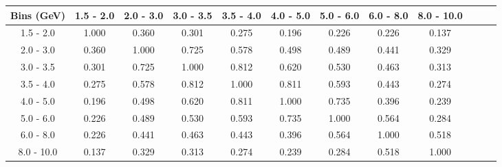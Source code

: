 \documentclass[aps, prd, reprint,showpacs,  preprintnumbers,amsmath,amssymb,superscriptaddress, nofootinbib]{revtex4-1}
\makeatletter
\newcommand{\anu}{\ensuremath{\bar{\nu}}}
\renewenvironment{table}
  {\def\@captype{table}}
  {}
\makeatother
\begin{document}
\begin{table}
\centering
\begin{tabular}{cccccccccccc}
\hline
    Bins (GeV) &  1.5 - 2.0 & 2.0 - 3.0 &  3.0 - 3.5 &    3.5 - 4.0 &    4.0 - 5.0 &    5.0 - 6.0 &    6.0 - 8.0 &   8.0 - 10.0  \\ 
\hline
  1.5 -   2.0  & 1.000  & 0.360  & 0.301  & 0.275  & 0.196  & 0.226  & 0.226  & 0.137 \\
  2.0 -   3.0  & 0.360  & 1.000  & 0.725  & 0.578  & 0.498  & 0.489  & 0.441  & 0.329 \\
  3.0 -   3.5  & 0.301  & 0.725  & 1.000  & 0.812  & 0.620  & 0.530  & 0.463  & 0.313 \\
  3.5 -   4.0  & 0.275  & 0.578  & 0.812  & 1.000  & 0.811  & 0.593  & 0.443  & 0.274 \\
  4.0 -   5.0  & 0.196  & 0.498  & 0.620  & 0.811  & 1.000  & 0.735  & 0.396  & 0.239 \\
  5.0 -   6.0  & 0.226  & 0.489  & 0.530  & 0.593  & 0.735  & 1.000  & 0.564  & 0.284 \\
  6.0 -   8.0  & 0.226  & 0.441  & 0.463  & 0.443  & 0.396  & 0.564  & 1.000  & 0.518 \\
  8.0 -  10.0  & 0.137  & 0.329  & 0.313  & 0.274  & 0.239  & 0.284  & 0.518  & 1.000 \\
\hline
\hline
\end{tabular}
\caption{Correlation matrix for bins of $\sigma(E_{\anu})$.}
\label{tb:piz_sigma-Ev_cov}
\end{table}
\end{document}
